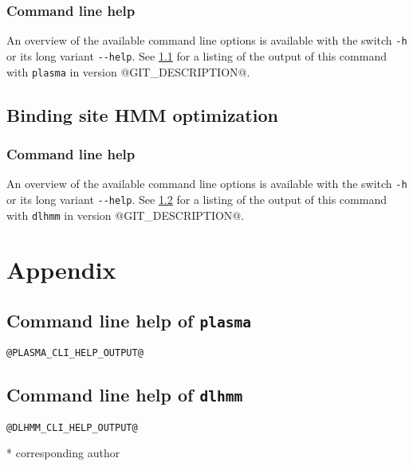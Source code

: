 \documentclass[a4paper]{article}
\makeatletter
\newcommand{\plasma}[0]{\texttt{plasma}}
\newcommand{\dlhmm}[0]{\texttt{dlhmm}}
\newcommand{\version}[0]{@GIT_DESCRIPTION@}
\makeatother
\begin{document}
\subsubsection{Command line help}
An overview of the available command line options is available with the switch \lstinline|-h| or its long variant \lstinline|--help|.
See \cref{appendix:plasma-cli-help} for a listing of the output of this command with \plasma{} in version \version{}.


\subsection{Binding site HMM optimization}
\label{subsection:running-dlhmm}
\subsubsection{Command line help}
An overview of the available command line options is available with the switch \lstinline|-h| or its long variant \lstinline|--help|.
See \cref{appendix:dlhmm-cli-help} for a listing of the output of this command with \dlhmm{} in version \version{}.

\section{Appendix}
\subsection{Command line help of \plasma{}}
\label{appendix:plasma-cli-help}
\begin{verbatim}
@PLASMA_CLI_HELP_OUTPUT@
\end{verbatim}

\subsection{Command line help of \dlhmm{}}
\label{appendix:dlhmm-cli-help}
\begin{verbatim}
@DLHMM_CLI_HELP_OUTPUT@
\end{verbatim}



\nocite{*}


* corresponding author
\end{document}
